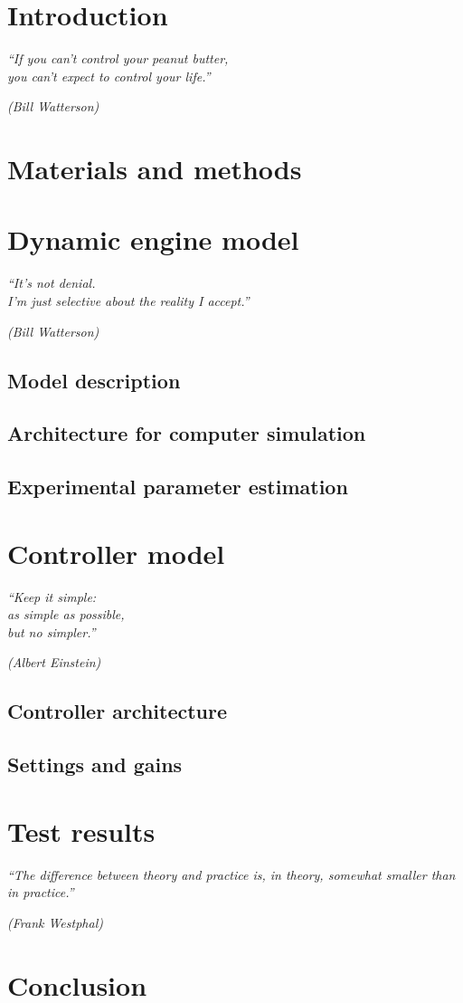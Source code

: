\textual

\chapter{Introduction}
\epigraph{\em ``If you can't control your peanut butter,\\ you can't expect to
control your life.''}{\em(Bill Watterson)}

\chapter{Materials and methods}

\chapter{Dynamic engine model}
\epigraph{\em ``It's not denial.\\ I'm just selective about the reality I
accept.''}{\em(Bill Watterson)}
\section{Model description}
\section{Architecture for computer simulation}
\section{Experimental parameter estimation}

\chapter{Controller model}
\epigraph{\em ``Keep it simple:\\
as simple as possible,\\
but no simpler.''}{\em (Albert Einstein)}
\section{Controller architecture}
\section{Settings and gains}

\chapter{Test results}
\epigraph{\em ``The difference between theory and practice is, in theory, somewhat
smaller than in practice.''}{\em (Frank Westphal)}

\chapter{Conclusion}

